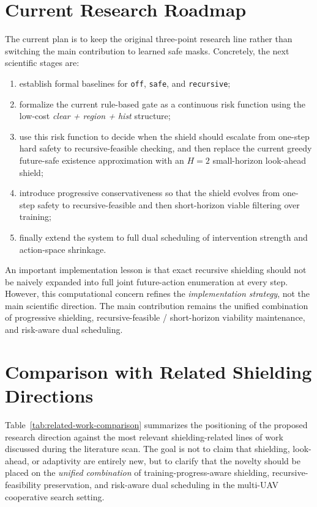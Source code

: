 \documentclass[11pt]{article}
\begin{document}
\section{Current Research Roadmap}

The current plan is to keep the original three-point research line rather than switching the main contribution to learned safe masks. Concretely, the next scientific stages are:
\begin{enumerate}[label=(\arabic*),leftmargin=1.8em]
    \item establish formal baselines for \texttt{off}, \texttt{safe}, and \texttt{recursive};
    \item formalize the current rule-based gate as a continuous risk function using the low-cost \emph{clear + region + hist} structure;
    \item use this risk function to decide when the shield should escalate from one-step hard safety to recursive-feasible checking, and then replace the current greedy future-safe existence approximation with an $H=2$ small-horizon look-ahead shield;
    \item introduce progressive conservativeness so that the shield evolves from one-step safety to recursive-feasible and then short-horizon viable filtering over training;
    \item finally extend the system to full dual scheduling of intervention strength and action-space shrinkage.
\end{enumerate}

An important implementation lesson is that exact recursive shielding should not be naively expanded into full joint future-action enumeration at every step. However, this computational concern refines the \emph{implementation strategy}, not the main scientific direction. The main contribution remains the unified combination of progressive shielding, recursive-feasible / short-horizon viability maintenance, and risk-aware dual scheduling.

\section{Comparison with Related Shielding Directions}

Table~\ref{tab:related-work-comparison} summarizes the positioning of the proposed research direction against the most relevant shielding-related lines of work discussed during the literature scan. The goal is not to claim that shielding, look-ahead, or adaptivity are entirely new, but to clarify that the novelty should be placed on the \emph{unified combination} of training-progress-aware shielding, recursive-feasibility preservation, and risk-aware dual scheduling in the multi-UAV cooperative search setting.
\end{document}

